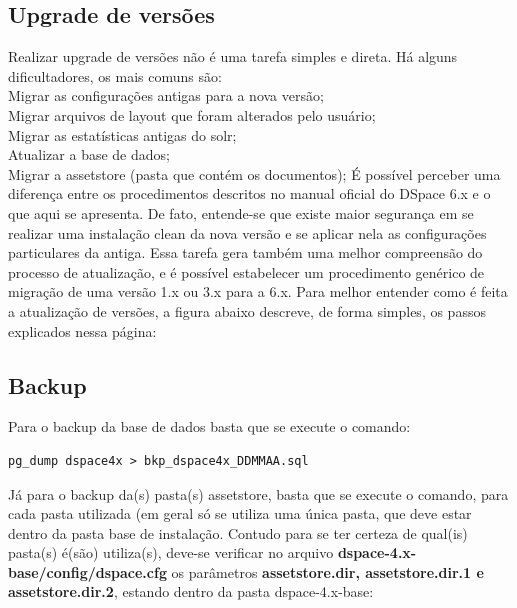 \documentclass[12pt,hidelinks]{article}
\begin{document}
\subsection{Upgrade de versões}
Realizar upgrade de versões não é uma tarefa simples e direta. Há alguns dificultadores, os mais comuns são:\\

\textbullet \hspace{6pt} Migrar as configurações antigas para a nova versão;\\
\textbullet \hspace{6pt} Migrar arquivos de layout que foram alterados pelo usuário;\\
\textbullet \hspace{6pt} Migrar as estatísticas antigas do solr;\\
\textbullet \hspace{6pt} Atualizar a base de dados;\\
\textbullet \hspace{6pt} Migrar a assetstore (pasta que contém os documentos);
\singlespacing
É possível perceber uma diferença entre os procedimentos descritos no manual oficial do DSpace 6.x e o que aqui se apresenta. De fato, entende-se que existe maior segurança em se realizar uma instalação clean da nova versão e se aplicar nela as configurações particulares da antiga. Essa tarefa gera também uma melhor compreensão do processo de atualização, e é possível estabelecer um procedimento genérico de migração de uma versão 1.x ou 3.x para a 6.x.
\singlespacing
Para melhor entender como é feita a atualização de versões, a figura abaixo descreve, de forma simples, os passos explicados nessa página:

\subsection{Backup}\label{cap_BKP}
Para o backup da base de dados basta que se execute o comando:

\begin{verbatim}
pg_dump dspace4x > bkp_dspace4x_DDMMAA.sql
\end{verbatim}

Já para o backup da(s) pasta(s) assetstore, basta que se execute o comando, para cada pasta utilizada (em geral só se utiliza uma única pasta, que deve estar dentro da pasta base de instalação. Contudo para se ter certeza de qual(is) pasta(s) é(são) utiliza(s), deve-se verificar no arquivo \textbf{dspace-4.x-base/config/dspace.cfg} os parâmetros \textbf{assetstore.dir, assetstore.dir.1 e assetstore.dir.2}, estando dentro da pasta dspace-4.x-base:   
\end{document}
